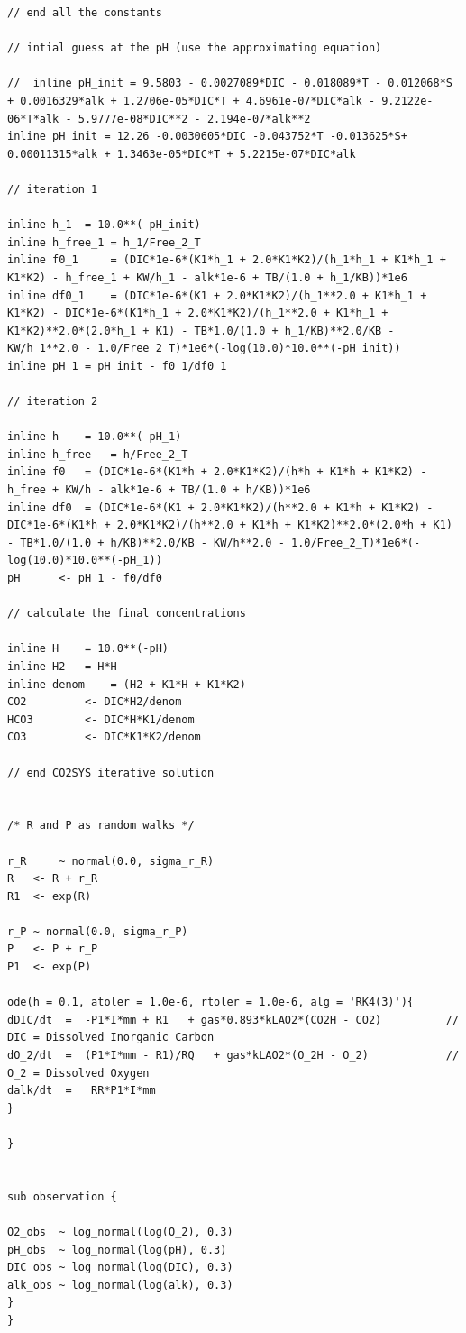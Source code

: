 \documentclass{ruthesis}
\begin{document}
\begin{verbatim}
// end all the constants

// intial guess at the pH (use the approximating equation)

//	inline pH_init = 9.5803 - 0.0027089*DIC - 0.018089*T - 0.012068*S + 0.0016329*alk + 1.2706e-05*DIC*T + 4.6961e-07*DIC*alk - 9.2122e-06*T*alk - 5.9777e-08*DIC**2 - 2.194e-07*alk**2 
inline pH_init = 12.26 -0.0030605*DIC -0.043752*T -0.013625*S+ 0.00011315*alk + 1.3463e-05*DIC*T + 5.2215e-07*DIC*alk

// iteration 1

inline h_1 	= 10.0**(-pH_init)
inline h_free_1	= h_1/Free_2_T
inline f0_1 	= (DIC*1e-6*(K1*h_1 + 2.0*K1*K2)/(h_1*h_1 + K1*h_1 + K1*K2) - h_free_1 + KW/h_1 - alk*1e-6 + TB/(1.0 + h_1/KB))*1e6
inline df0_1 	= (DIC*1e-6*(K1 + 2.0*K1*K2)/(h_1**2.0 + K1*h_1 + K1*K2) - DIC*1e-6*(K1*h_1 + 2.0*K1*K2)/(h_1**2.0 + K1*h_1 + K1*K2)**2.0*(2.0*h_1 + K1) - TB*1.0/(1.0 + h_1/KB)**2.0/KB - KW/h_1**2.0 - 1.0/Free_2_T)*1e6*(-log(10.0)*10.0**(-pH_init))
inline pH_1	= pH_init - f0_1/df0_1

// iteration 2

inline h 	= 10.0**(-pH_1)
inline h_free 	= h/Free_2_T
inline f0 	= (DIC*1e-6*(K1*h + 2.0*K1*K2)/(h*h + K1*h + K1*K2) - h_free + KW/h - alk*1e-6 + TB/(1.0 + h/KB))*1e6
inline df0 	= (DIC*1e-6*(K1 + 2.0*K1*K2)/(h**2.0 + K1*h + K1*K2) - DIC*1e-6*(K1*h + 2.0*K1*K2)/(h**2.0 + K1*h + K1*K2)**2.0*(2.0*h + K1) - TB*1.0/(1.0 + h/KB)**2.0/KB - KW/h**2.0 - 1.0/Free_2_T)*1e6*(-log(10.0)*10.0**(-pH_1))
pH 		<- pH_1 - f0/df0    

// calculate the final concentrations

inline H 	= 10.0**(-pH)
inline H2 	= H*H
inline denom 	= (H2 + K1*H + K1*K2)
CO2  		<- DIC*H2/denom
HCO3 		<- DIC*H*K1/denom
CO3  		<- DIC*K1*K2/denom  

// end CO2SYS iterative solution


/* R and P as random walks */

r_R 	~ normal(0.0, sigma_r_R)
R 	<- R + r_R
R1 	<- exp(R)

r_P ~ normal(0.0, sigma_r_P)
P 	<- P + r_P
P1 	<- exp(P)

ode(h = 0.1, atoler = 1.0e-6, rtoler = 1.0e-6, alg = 'RK4(3)'){
dDIC/dt  =  -P1*I*mm + R1 	+ gas*0.893*kLAO2*(CO2H - CO2)  		// DIC = Dissolved Inorganic Carbon 
dO_2/dt	 =  (P1*I*mm - R1)/RQ 	+ gas*kLAO2*(O_2H - O_2)	 		// O_2 = Dissolved Oxygen 
dalk/dt  =   RR*P1*I*mm
}

}


sub observation {

O2_obs  ~ log_normal(log(O_2), 0.3)
pH_obs  ~ log_normal(log(pH), 0.3)
DIC_obs ~ log_normal(log(DIC), 0.3) 
alk_obs ~ log_normal(log(alk), 0.3)
}
}
\end{verbatim}
\end{document}
